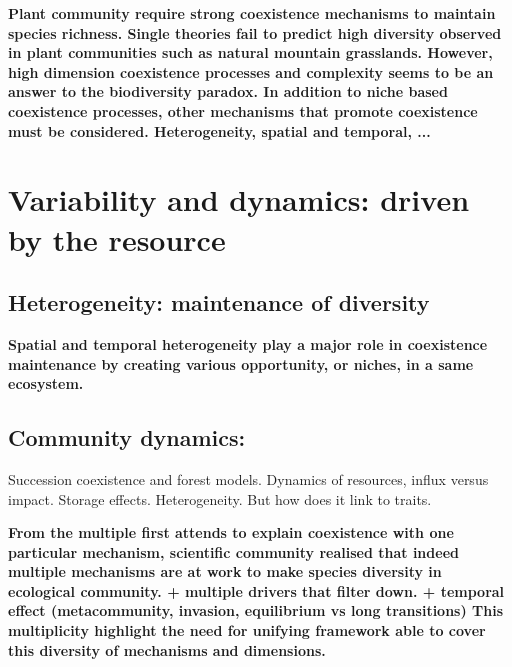 \textbf{Plant community require strong coexistence mechanisms to maintain species richness. Single theories fail to predict high diversity observed in plant communities such as natural mountain grasslands. However, high dimension coexistence processes and complexity seems to be an answer to the biodiversity paradox. In addition to niche based coexistence processes, other mechanisms that promote coexistence must be considered. Heterogeneity, spatial and temporal, ... }




 \section{Variability and dynamics: driven by the resource}



\subsection{Heterogeneity: maintenance of diversity}

\textbf{Spatial and temporal heterogeneity play a major role in coexistence maintenance by creating various opportunity, or niches, in a same ecosystem.}

\subsection{Community dynamics: }


 Succession coexistence and forest models. Dynamics of resources, influx versus impact. Storage effects. Heterogeneity. But how does it link to traits.

\textbf{From the multiple first attends to explain coexistence with one particular mechanism, scientific community realised that indeed multiple mechanisms are at work to make species diversity in ecological community. 
+ multiple drivers that filter down. + temporal effect (metacommunity, invasion, equilibrium vs long transitions)
 This multiplicity highlight the need for unifying framework able to cover this diversity of mechanisms and dimensions.}
 
